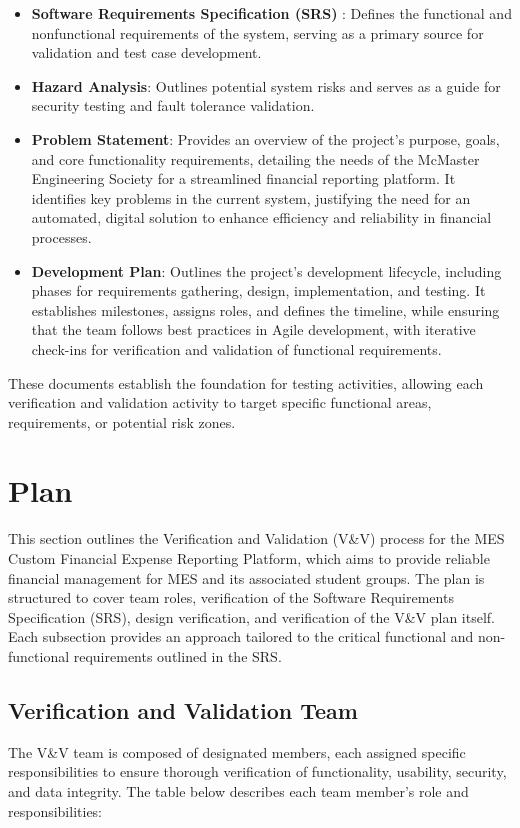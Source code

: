 \documentclass[12pt, titlepage]{article}
\begin{document}
\begin{itemize}
    \item \textbf{Software Requirements Specification (SRS)} \citep{SRS}: Defines the functional and nonfunctional requirements of the system, serving as a primary source for validation and test case development.
    \item \textbf{Hazard Analysis}\citep{HazardAnalysis}: Outlines potential system risks and serves as a guide for security testing and fault tolerance validation.
    \item \textbf{Problem Statement}\citep{ProblemStatement}: Provides an overview of the project's purpose, goals, and core functionality requirements, detailing the needs of the McMaster Engineering Society for a streamlined financial reporting platform. It identifies key problems in the current system, justifying the need for an automated, digital solution to enhance efficiency and reliability in financial processes.
    \item \textbf{Development Plan}\citep{DevelopmentPlan}: Outlines the project's development lifecycle, including phases for requirements gathering, design, implementation, and testing. It establishes milestones, assigns roles, and defines the timeline, while ensuring that the team follows best practices in Agile development, with iterative check-ins for verification and validation of functional requirements.
\end{itemize}

These documents establish the foundation for testing activities, allowing each verification and validation activity to target specific functional areas, requirements, or potential risk zones.

\section{Plan}
This section outlines the Verification and Validation (V\&V) process for the MES Custom Financial Expense Reporting Platform, which aims to provide reliable financial management for MES and its associated student groups. The plan is structured to cover team roles, verification of the Software Requirements Specification (SRS), design verification, and verification of the V\&V plan itself. Each subsection provides an approach tailored to the critical functional and non-functional requirements outlined in the SRS.

\subsection{Verification and Validation Team}
The V\&V team is composed of designated members, each assigned specific responsibilities to ensure thorough verification of functionality, usability, security, and data integrity. The table below describes each team member's role and responsibilities:
\end{document}

